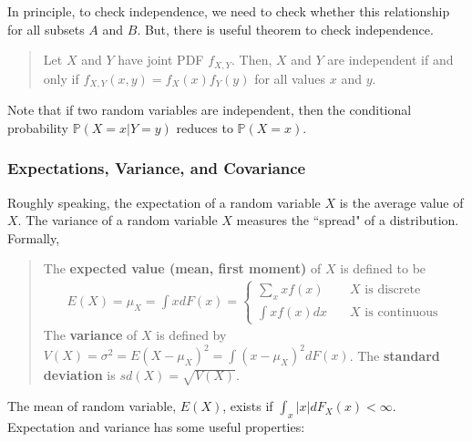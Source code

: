\documentclass[
  12pt,
]{article}
\begin{document}
In principle, to check independence, we need to check whether this relationship for all subsets \(A\) and \(B\).
But, there is useful theorem to check independence.

\begin{quote}
Let \(X\) and \(Y\) have joint PDF \(f_{X,Y}\). Then, \(X\) and \(Y\) are independent if and only if \(f_{X,Y}(x,y) = f_X(x) f_Y(y)\) for all values \(x\) and \(y\).
\end{quote}

Note that if two random variables are independent,
then the conditional probability \(\mathbb{P}(X = x | Y = y)\) reduces to \(\mathbb{P}(X = x)\).

\hypertarget{expectations-variance-and-covariance}{%
\subsubsection{Expectations, Variance, and Covariance}\label{expectations-variance-and-covariance}}

Roughly speaking, the expectation of a random variable \(X\) is the average value of \(X\).
The variance of a random variable \(X\) measures the ``spread" of a distribution.
Formally,

\begin{quote}
The \textbf{expected value (mean, first moment)} of \(X\) is defined to be
\begin{align*}
E(X) 
= \mu_X
= \int x dF(x) 
=
\begin{cases}
\sum_x x f(x)  &\quad\text{$X$ is discrete}  \\
\int x f(x) dx &\quad\text{$X$ is continuous} 
\end{cases}
\end{align*}
The \textbf{variance} of \(X\) is defined by \(V(X) = \sigma^2 = E(X - \mu_X)^2 = \int (x - \mu_X)^2 dF(x)\). The \textbf{standard deviation} is \(sd(X) = \sqrt{V(X)}\).
\end{quote}

The mean of random variable, \(E(X)\), exists if \(\int_x |x| dF_X(x) < \infty\).
Expectation and variance has some useful properties:
\end{document}

